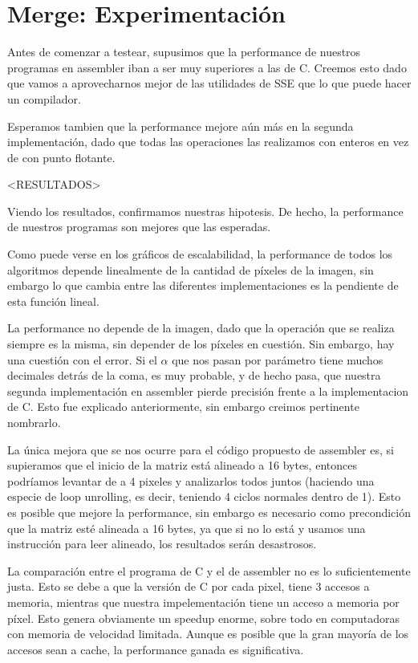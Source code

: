 \section*{Merge: Experimentación}

Antes de comenzar a testear, supusimos que la performance de nuestros programas en assembler iban a ser muy superiores a las de C. Creemos esto dado que vamos a aprovecharnos mejor de las utilidades de SSE que lo que puede hacer un compilador. 

Esperamos tambien que la performance mejore aún más en la segunda implementación, dado que todas las operaciones las realizamos con enteros en vez de con punto flotante.



<RESULTADOS>



Viendo los resultados, confirmamos nuestras hipotesis. De hecho, la performance de nuestros programas son mejores que las esperadas.

Como puede verse en los gráficos de escalabilidad, la performance de todos los algoritmos depende linealmente de la cantidad de píxeles de la imagen, sin embargo lo que cambia entre las diferentes implementaciones es la pendiente de esta función lineal.

La performance no depende de la imagen, dado que la operación que se realiza siempre es la misma, sin depender de los píxeles en cuestión.
Sin embargo, hay una cuestión con el error. Si el $\alpha$ que nos pasan por parámetro tiene muchos decimales detrás de la coma, es muy probable, y de hecho pasa, que nuestra segunda implementación en assembler pierde precisión frente a la implementacion de C. Esto fue explicado anteriormente, sin embargo creimos pertinente nombrarlo.

La única mejora que se nos ocurre para el código propuesto de assembler es, si supieramos que el inicio de la matriz está alineado a 16 bytes, entonces podríamos levantar de a 4 pixeles y analizarlos todos juntos (haciendo una especie de loop unrolling, es decir, teniendo 4 ciclos normales dentro de 1).
Esto es posible que mejore la performance, sin embargo es necesario como precondición que la matriz esté alineada a 16 bytes, ya que si no lo está y usamos una instrucción para leer alineado, los resultados serán desastrosos.

La comparación entre el programa de C y el de assembler no es lo suficientemente justa. Esto se debe a que la versión de C por cada pixel, tiene 3 accesos a memoria, mientras que nuestra impelementación tiene un acceso a memoria por píxel. Esto genera obviamente un speedup enorme, sobre todo en computadoras con memoria de velocidad limitada.
Aunque es posible que la gran mayoría de los accesos sean a cache, la performance ganada es significativa.

